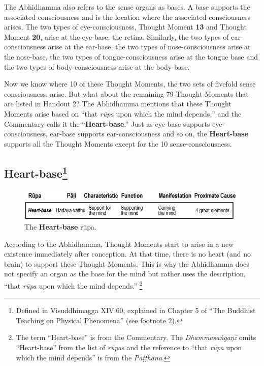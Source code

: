 The Abhidhamma also refers to the sense organs as bases. A base supports the associated consciousness and is the location where the associated consciousness arises. The two types of eye-consciousness, Thought Moment \textbf{13} and Thought Moment \textbf{20}, arise at the eye-base, the retina. Similarly, the two types of ear-consciousness arise at the ear-base, the two types of nose-consciousness arise at the nose-base, the two types of tongue-consciousness arise at the tongue base and the two types of body-consciousness arise at the body-base.

Now we know where 10 of these Thought Moments, the two sets of fivefold sense consciousness, arise. But what about the remaining 79 Thought Moments that are listed in Handout 2? The Abhidhamma mentions that these Thought Moments arise based on “that \textit{rūpa} upon which the mind depends,” and the Commentary calls it the “\textbf{Heart-base}.” Just as eye-base supports eye-consciousness, ear-base supports ear-consciousness and so on, the \textbf{Heart-base} supports all the Thought Moments except for the 10 sense-consciousness.

\subsection*{Heart-base\footnote{Defined in Visuddhimagga XIV.60, explained in Chapter 5 of “The Buddhist Teaching on Physical Phenomena” (see footnote 2).}}

\begin{figure}[h]
\centering
\includegraphics[width=0.8\linewidth]{./Diagrams/Heart}
\caption{The \textbf{Heart-base} rūpa.}
\label{fig:Heart}
\end{figure}

According to the Abhidhamma, Thought Moments start to arise in a new existence immediately after conception. At that time, there is no heart (and no brain) to support these Thought Moments. This is why the Abhidhamma does not specify an organ as the base for the mind but rather uses the description, “that \textit{rūpa} upon which the mind depends.” \footnote{The term “Heart-base” is from the Commentary. The \textit{Dhammasaṅgaṇī} omits “Heart-base” from the list of \textit{rūpas} and the reference to “that \textit{rūpa} upon which the mind depends” is from the \textit{Paṭṭhāna}.}

